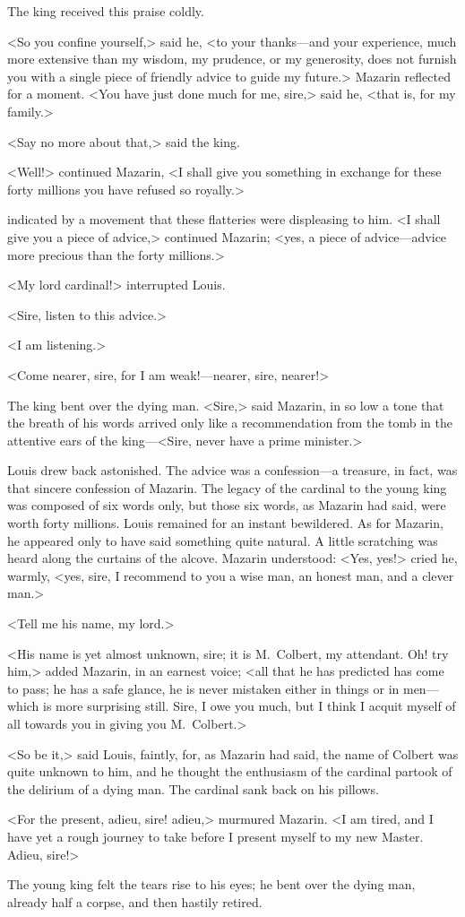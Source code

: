 The king received this praise coldly.

<So you confine yourself,> said he, <to your thanks—and your experience, much more extensive than my wisdom, my prudence, or my generosity, does not furnish you with a single piece of friendly advice to guide my future.> Mazarin reflected for a moment. <You have just done much for me, sire,> said he, <that is, for my family.>

<Say no more about that,> said the king.

<Well!> continued Mazarin, <I shall give you something in exchange for these forty millions you have refused so royally.>

 indicated by a movement that these flatteries were displeasing to him. <I shall give you a piece of advice,> continued Mazarin; <yes, a piece of advice—advice more precious than the forty millions.>

<My lord cardinal!> interrupted Louis.

<Sire, listen to this advice.>

<I am listening.>

<Come nearer, sire, for I am weak!—nearer, sire, nearer!>

The king bent over the dying man. <Sire,> said Mazarin, in so low a tone that the breath of his words arrived only like a recommendation from the tomb in the attentive ears of the king—<Sire, never have a prime minister.>

Louis drew back astonished. The advice was a confession—a treasure, in fact, was that sincere confession of Mazarin. The legacy of the cardinal to the young king was composed of six words only, but those six words, as Mazarin had said, were worth forty millions. Louis remained for an instant bewildered. As for Mazarin, he appeared only to have said something quite natural. A little scratching was heard along the curtains of the alcove. Mazarin understood: <Yes, yes!> cried he, warmly, <yes, sire, I recommend to you a wise man, an honest man, and a clever man.>

<Tell me his name, my lord.>

<His name is yet almost unknown, sire; it is M.~Colbert, my attendant. Oh! try him,> added Mazarin, in an earnest voice; <all that he has predicted has come to pass; he has a safe glance, he is never mistaken either in things or in men—which is more surprising still. Sire, I owe you much, but I think I acquit myself of all towards you in giving you M.~Colbert.>

<So be it,> said Louis, faintly, for, as Mazarin had said, the name of Colbert was quite unknown to him, and he thought the enthusiasm of the cardinal partook of the delirium of a dying man. The cardinal sank back on his pillows.

<For the present, adieu, sire! adieu,> murmured Mazarin. <I am tired, and I have yet a rough journey to take before I present myself to my new Master. Adieu, sire!>

The young king felt the tears rise to his eyes; he bent over the dying man, already half a corpse, and then hastily retired. 
